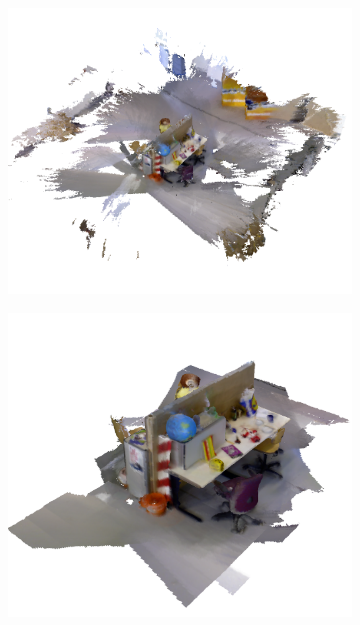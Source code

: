 \documentclass[10pt,twocolumn,letterpaper]{article}
\begin{document}
\begin{figure}
\begin{minipage}{0.25\linewidth}
\begin{subfigure}{1.0\linewidth}
			 \caption{} 
			 \label{fig:memory_data2}
		 \end{subfigure}
	 \end{minipage} 
	 \begin{minipage} {0.25\linewidth} 
	  \begin{subfigure}{1.0\linewidth} \centering 
		\includegraphics[width=1.0\textwidth]{img/freiburg_5m.png}
		 \caption{}
		 \label{fig:freiburg_5m}
	 	\end{subfigure} 
 		\begin{subfigure}{1.0\linewidth} \centering
		\includegraphics[width=1.0\textwidth]{img/freiburg_2m.png}

\end{subfigure}
\end{minipage}
\end{figure}
\end{document}
